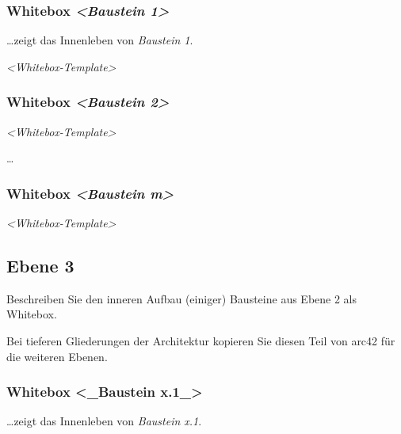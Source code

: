 \documentclass[
]{article}
\begin{document}
\hypertarget{_whitebox_emphasis_baustein_1_emphasis}{%
\subsubsection{\texorpdfstring{Whitebox \emph{\textless Baustein
1\textgreater{}}}{Whitebox \textless Baustein 1\textgreater{}}}\label{_whitebox_emphasis_baustein_1_emphasis}}

\ldots zeigt das Innenleben von \emph{Baustein 1}.

\emph{\textless Whitebox-Template\textgreater{}}

\hypertarget{_whitebox_emphasis_baustein_2_emphasis}{%
\subsubsection{\texorpdfstring{Whitebox \emph{\textless Baustein
2\textgreater{}}}{Whitebox \textless Baustein 2\textgreater{}}}\label{_whitebox_emphasis_baustein_2_emphasis}}

\emph{\textless Whitebox-Template\textgreater{}}

\ldots{}

\hypertarget{_whitebox_emphasis_baustein_m_emphasis}{%
\subsubsection{\texorpdfstring{Whitebox \emph{\textless Baustein
m\textgreater{}}}{Whitebox \textless Baustein m\textgreater{}}}\label{_whitebox_emphasis_baustein_m_emphasis}}

\emph{\textless Whitebox-Template\textgreater{}}

\hypertarget{_ebene_3}{%
\subsection{Ebene 3}\label{_ebene_3}}

Beschreiben Sie den inneren Aufbau (einiger) Bausteine aus Ebene 2 als
Whitebox.

Bei tieferen Gliederungen der Architektur kopieren Sie diesen Teil von
arc42 für die weiteren Ebenen.

\hypertarget{_whitebox_baustein_x_1}{%
\subsubsection{Whitebox \textless\_Baustein
x.1\_\textgreater{}}\label{_whitebox_baustein_x_1}}

\ldots zeigt das Innenleben von \emph{Baustein x.1}.
\end{document}
